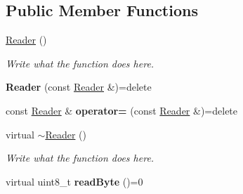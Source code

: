 \subsection*{Public Member Functions}
\begin{DoxyCompactItemize}
\item 
\hyperlink{classReader_adcda31b507720ab44044d7a21686fba2}{Reader} ()
\begin{DoxyCompactList}\small\item\em Write what the function does here. \end{DoxyCompactList}\item 
\hypertarget{classReader_a5fc83c2631c4e98ddda1eca933077ff3}{{\bfseries Reader} (const \hyperlink{classReader}{Reader} \&)=delete}\label{classReader_a5fc83c2631c4e98ddda1eca933077ff3}

\item 
\hypertarget{classReader_af0484296f2fb2a7767fdd0185a901a8a}{const \hyperlink{classReader}{Reader} \& {\bfseries operator=} (const \hyperlink{classReader}{Reader} \&)=delete}\label{classReader_af0484296f2fb2a7767fdd0185a901a8a}

\item 
virtual \hyperlink{classReader_a357153a7085f8b606de954a80411e27a}{$\sim$\+Reader} ()
\begin{DoxyCompactList}\small\item\em Write what the function does here. \end{DoxyCompactList}\item 
\hypertarget{classReader_afa26f612f949e3ddba13943e7fca7ba1}{virtual uint8\+\_\+t {\bfseries read\+Byte} ()=0}\label{classReader_afa26f612f949e3ddba13943e7fca7ba1}


\end{DoxyCompactItemize}
